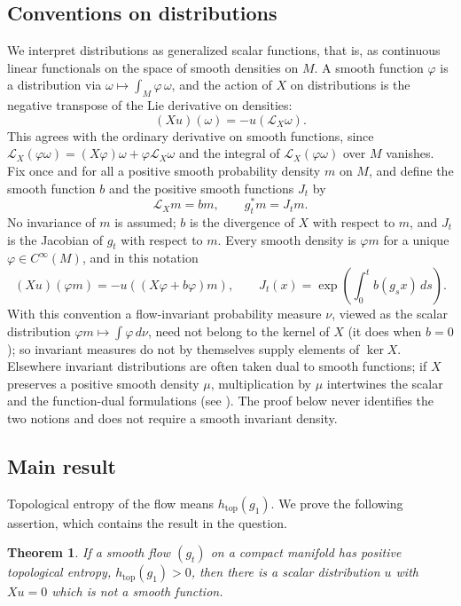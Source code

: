 \documentclass[11pt]{article}
\newtheorem{theorem}{Theorem}[section]
\theoremstyle{remark}
\newcommand{\LX}{\mathcal L_X}
\newcommand{\htop}{h_{\mathrm{top}}}
\begin{document}
\subsection{Conventions on distributions}
\label{sec:conventions}

We interpret distributions as generalized scalar functions, that is,
as continuous linear functionals on the space of smooth densities on
\(M\).  A smooth function \(\varphi\) is a distribution via
\(\omega\mapsto\int_M\varphi\,\omega\), and the action of \(X\) on
distributions is the negative transpose of the Lie derivative on
densities:
\[
 (Xu)(\omega)=-u(\mathcal L_X\omega).
\]
This agrees with the ordinary derivative on smooth functions, since
\(\LX(\varphi\omega)=(X\varphi)\omega+\varphi\LX\omega\) and the
integral of \(\LX(\varphi\omega)\) over \(M\) vanishes.
Fix once and for all a positive smooth probability density \(m\) on
\(M\), and define the smooth function \(b\) and the positive smooth
functions \(J_t\) by
\[
 \mathcal L_Xm=bm,\qquad g_t^*m=J_tm .
\]
No invariance of \(m\) is assumed; \(b\) is the divergence of \(X\)
with respect to \(m\), and \(J_t\) is the Jacobian of \(g_t\)
with respect to \(m\).  Every smooth density is \(\varphi m\) for a
unique \(\varphi\in C^\infty(M)\), and in this notation
\begin{equation}\label{eq:scalar}
 (Xu)(\varphi m)=-u((X\varphi+b\varphi)m),\qquad
 J_t(x)=\exp\!\left(\int_0^t b(g_sx)\,ds\right).
\end{equation}
With this convention a flow-invariant probability measure \(\nu\),
viewed as the scalar distribution \(\varphi m\mapsto\int\varphi\,d\nu\),
need not belong to the kernel of \(X\) (it does when \(b=0\)); so
invariant measures do not by themselves supply elements of
\(\ker X\).
Elsewhere invariant distributions are often taken dual to smooth
functions; if \(X\) preserves a positive smooth density \(\mu\),
multiplication by \(\mu\) intertwines the scalar and the
function-dual formulations (see \cite[Section~3]{Forni2008}).  The
proof below never identifies the two notions and does not require a
smooth invariant density.

\subsection{Main result}

Topological entropy of the flow means \(\htop(g_1)\).
We prove the following assertion, which contains the result in the
question.

\begin{theorem}\label{thm:obstruction}
If a smooth flow \((g_t)\) on a compact manifold has positive
topological entropy, \(\htop(g_1)>0\), then there is a scalar
distribution \(u\) with \(Xu=0\) which is not a smooth function.
\end{theorem}
\end{document}
